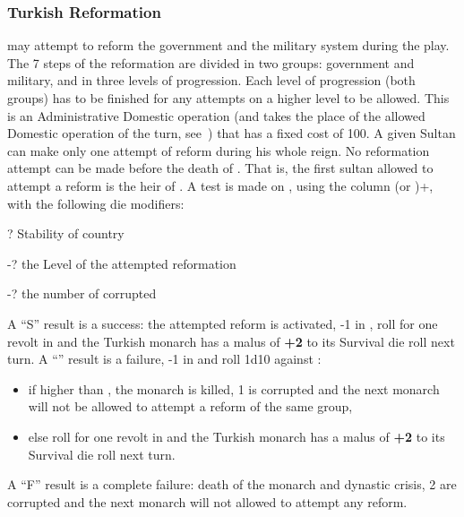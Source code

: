 \subsubsection{Turkish Reformation}
 \TUR may attempt to reform the
government and the military system during the play.  The 7 steps of the
reformation are divided in two groups: government and military, and in
three levels of progression. Each level of progression (both groups) has
to be finished for any attempts on a higher level to be allowed.
\bparag This is an Administrative Domestic operation (and takes the
place of the allowed Domestic operation of the turn,
see~) that has a fixed cost of
100\ducats.
\bparag A given Sultan can make only one attempt of reform during his
whole reign.
\bparag No reformation attempt can be made before the death of
. That is, the first sultan allowed to attempt a
reform is the heir of .
\bparag A test is made on ,
using the column (\MIL or \ADM)+, with the following die
modifiers:
\begin{modlist}
\item[\textpm?] Stability of country
\item[-?] the Level of the attempted reformation
\item[-?]  the number of corrupted \Pashas
\end{modlist}
\bparag A ``S'' result is a success: the attempted reform is activated,
-1 in \STAB, roll for one revolt in \TUR and the Turkish monarch has a
malus of {\bf +2} to its Survival die roll next turn.
\bparag A ``\undemi'' result is a failure, -1 in \STAB and roll 1d10
against \FTI:
\begin{itemize}
\item if higher than \FTI, the monarch is killed, 1 \Pasha is corrupted
  and the next monarch will not be allowed to attempt a reform of the
  same group,
\item else roll for one revolt in \TUR and the Turkish monarch has a
  malus of {\bf +2} to its Survival die roll next turn.
\end{itemize}
\bparag A ``F'' result is a complete failure: death of the monarch and
dynastic crisis, 2 \Pashas are corrupted and the next monarch will not
allowed to attempt any reform.

